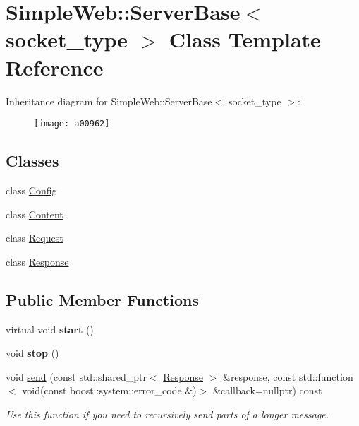 \hypertarget{a00962}{}\section{Simple\+Web\+:\+:Server\+Base$<$ socket\+\_\+type $>$ Class Template Reference}
\label{a00962}
Inheritance diagram for Simple\+Web\+:\+:Server\+Base$<$ socket\+\_\+type $>$\+:\begin{figure}[H]
\begin{center}
\leavevmode
\texttt{[image: a00962]}
\end{center}
\end{figure}
\subsection*{Classes}
\begin{DoxyCompactItemize}
\item 
class \hyperlink{a00978}{Config}
\item 
class \hyperlink{a00970}{Content}
\item 
class \hyperlink{a00974}{Request}
\item 
class \hyperlink{a00966}{Response}
\end{DoxyCompactItemize}
\subsection*{Public Member Functions}
\begin{DoxyCompactItemize}
\item 
\mbox{\label{a00962_a759d6dae5fa77c47a36f7355fd33f8f7}} 
virtual void {\bfseries start} ()
\item 
\mbox{\label{a00962_a0667e44595f6c23016bee67c646ccc85}} 
void {\bfseries stop} ()
\item 
\mbox{\label{a00962_a93fd842b1a02dd63716ff0718f6069ce}} 
void \hyperlink{a00962_a93fd842b1a02dd63716ff0718f6069ce}{send} (const std\+::shared\+\_\+ptr$<$ \hyperlink{a00966}{Response} $>$ \&response, const std\+::function$<$ void(const boost\+::system\+::error\+\_\+code \&)$>$ \&callback=nullptr) const
\begin{DoxyCompactList}\small\item\em Use this function if you need to recursively send parts of a longer message. \end{DoxyCompactList}\end{DoxyCompactItemize}
